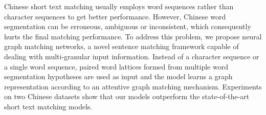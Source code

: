Chinese short text matching usually employs word sequences rather than character sequences to get better performance. However, Chinese word segmentation can be erroneous, ambiguous or inconsistent, which consequently hurts the final matching performance. To address this problem, we propose neural graph matching networks, a novel sentence matching framework capable of dealing with multi-granular input information. Instead of a character sequence or a single word sequence, paired word lattices formed from multiple word segmentation hypotheses are used as input and the model learns a graph representation according to an attentive graph matching mechanism. Experiments on two Chinese datasets show that our models outperform the state-of-the-art short text matching models.
